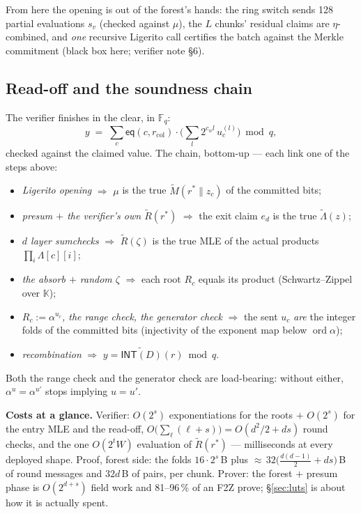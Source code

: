 \documentclass[11pt]{article}
\newcommand{\F}{\mathbb{F}}
\newcommand{\K}{\mathbb{K}}            %
\newcommand{\Fq}{\F_q}                 %
\newcommand{\INT}{\mathsf{INT}}
\newcommand{\mle}[1]{\widetilde{#1}}
\newcommand{\eq}{\mathsf{eq}}
\newcommand{\cw}{c_w}
\theoremstyle{definition}
\begin{document}
From here the opening is out of the forest's hands: the ring switch
sends 128 partial evaluations $s_v$ (checked against $\mu$), the $L$
chunks' residual claims are $\eta$-combined, and \emph{one} recursive
Ligerito call certifies the batch against the Merkle commitment
(black box here; verifier note \S6).

\subsection{Read-off and the soundness chain}
\label{sec:soundness}

The verifier finishes in the clear, in $\Fq$:
\[
  y \;=\; \sum_c \eq(c, r_{\mathrm{col}}) \cdot
          \Big(\sum_l 2^{\cw l}\, u^{(l)}_c\Big) \bmod q,
\]
checked against the claimed value.  The chain, bottom-up --- each link
one of the steps above:
\begin{itemize}[itemsep=1pt]
\item \emph{Ligerito opening} $\Rightarrow$ $\mu$ is the true
  $\mle{M}(r^* \| z_c)$ of the committed bits;
\item \emph{presum $+$ the verifier's own $\mle{R}(r^*)$} $\Rightarrow$
  the exit claim $e_d$ is the true $\mle{\Lambda}(z)$;
\item \emph{$d$ layer sumchecks} $\Rightarrow$ $\mle{R}(\zeta)$ is the
  true MLE of the actual products $\prod_i \Lambda[c][i]$;
\item \emph{the absorb $+$ random $\zeta$} $\Rightarrow$ each root
  $R_c$ equals its product (Schwartz--Zippel over $\K$);
\item \emph{$R_c := \alpha^{u_c}$, the range check, the generator
  check} $\Rightarrow$ the sent $u_c$ \emph{are} the integer folds of
  the committed bits (injectivity of the exponent map below
  $\operatorname{ord}\alpha$);
\item \emph{recombination} $\Rightarrow$ $y = \mle{\INT(D)}(r) \bmod q$.
\end{itemize}
Both the range check and the generator check are load-bearing: without
either, $\alpha^{u} = \alpha^{u'}$ stops implying $u = u'$.

\medskip
\noindent
\textbf{Costs at a glance.}  Verifier: $O(2^s)$ exponentiations for the
roots $+$ $O(2^s)$ for the entry MLE and the read-off,
$O\big(\sum_\ell (\ell + s)\big) = O(d^2/2 + ds)$ round checks, and the
one $O(2^t W)$ evaluation of $\mle{R}(r^*)$ --- milliseconds at every
deployed shape.  Proof, forest side: the folds $16 \cdot 2^s$\,B plus
${\approx}\,32\big(\tfrac{d(d-1)}{2} + ds\big)$\,B of round messages and
$32d$\,B of pairs, per chunk.  Prover: the forest $+$ presum phase is
$O(2^{d+s})$ field work and 81--96\,\% of an F2Z prove; \S\ref{sec:luts}
is about how it is actually spent.
\end{document}
